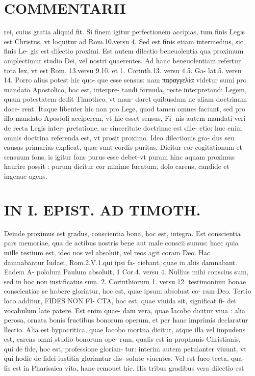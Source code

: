 \documentclass{article}
\begin{document}
\begin{pages}
\section*{COMMENTARII }
\marginpar{[ p.22 ]}\pstart rei, cuius gratia aliquid fit. Si finem igitur perfectionem accipias, tum finis Legis est Christus, vt loquitur ad Rom.10.versu 4. Sed est finis etiam intermedius, sic finis Le- gis est dilectio proximi. Est autem dilectio beneuolentia qua proximum amplectimur studio Dei, vel nostri quaerentes. Ad hanc beneuolentiam refertur tota lex, vt est Rom. 13.versu 9.10. et 1. Corinth.13. versu 4.5. Ga- lat.5. versu 14. Porro alius potest hic quo- que esse sensus: nam παραγγελία videtur sumi pro mandato Apostolico, hoc est, interpre- tandi formula, recte interpretandi Legem, quam potestatem dedit Timotheo, vt man- daret quibusdam ne aliam doctrinam doce- rent. Itaque libenter hic non pro Lege, quod tamen omnes faciunt, sed pro illo mandato Apostoli acciperem, vt hic esset sensus, Fi- nis autem mandati veri de recta Legis inter- pretatione, ac sinceritate doctrinae est dile- ctio: huc enim omnis doctrina referenda est, vt prosit proximo. Ideo dilectionis gra- dus seu causas primarias explicat, quae sunt cordis puritas. Dicitur cor cogitationum et sensuum fons, is igitur fons purus esse debet-vt puram hinc aquam proximus haurire possit : purum dicitur cor minime fucatum, dolo carens, candide et ingenue agens.  \pend
\section*{IN I. EPIST. AD TIMOTH. }
\marginpar{[ p.23 ]}\pstart Deinde proximus est gradus, conscientia bona, hoc est, integra. Est conscientia pars memoriae, qua de actibus  nostris bene aut male conscii sumus: haec quia mille testium est, ideo nos vel absoluit, vel reos agit coram Deo. Hac damnabantur Iudaei, Rom.2.V.1.qui ipsi fa- ciebant, quae in aliis damnabant. Eadem A- pololum Paulum absoluit, 1 Cor.4. versu 4. Nullius mihi conscius sum, sed in hoc non iustificatus sum. 2. Corinthiorum 1. versu 12. testimonium bonae conscientiae se habere gloriatur, hoc est, quae ipsum absoluat co- ram Deo.  \pend\pstart Tertio loco additur, FIDES NON FI- CTA, hoc est, quae viuida sit, significat fi- dei vocabulum late patere. Est enim quae- dam vera, quae Iacobo dicitur viua : alia perosa, ornata bonis fructibus bonorum operum, et per hanc imprimis declaratur llectio. Alia est hypocritica, quae Iacobo mortua dicitur, atque illa vel impudens est, carens omni studio bonorum ope- rum, qualis est in prophanis Christianis, qui de fide, hoc est, professione glorian- tur: interim autem petulanter viuunt, vt qui hodie de fidei iustitia gloriantur dis- solute viuentes. Vel est fuco tecta, qua- lis est in Pharisaica vita, hanc remouet hic. His tribus gradibus vera dilectio est  \pend

\end{pages}
\end{document}
